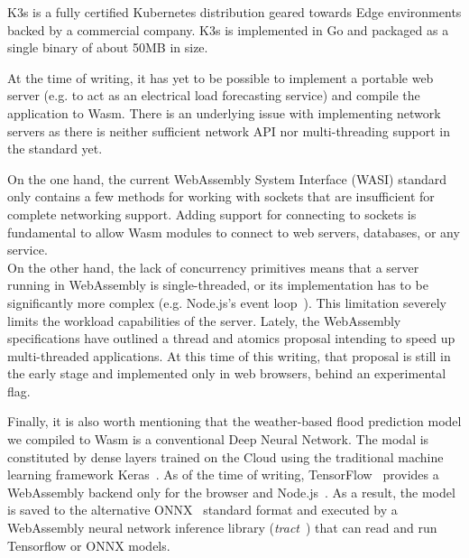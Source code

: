 K3s is a fully certified Kubernetes distribution geared towards Edge environments backed by a commercial company. K3s is implemented in Go and packaged as a single binary of about 50MB in size.

At the time of writing, it has yet to be possible to implement a portable web server (e.g. to act as an electrical load forecasting service) and compile the application to Wasm. There is an underlying issue with implementing network servers as there is neither sufficient network API nor multi-threading support in the standard yet.

On the one hand, the current WebAssembly System Interface (WASI) standard only contains a few methods for working with sockets that are insufficient for complete networking support. Adding support for connecting to sockets is fundamental to allow Wasm modules to connect to web servers, databases, or any service. \\
On the other hand, the lack of concurrency primitives means that a server running in WebAssembly is single-threaded, or its implementation has to be significantly more complex (e.g. Node.js's event loop~\cite{nodejs-event-loop}). This limitation severely limits the workload capabilities of the server. Lately, the WebAssembly specifications have outlined a thread and atomics proposal intending to speed up multi-threaded applications. At this time of this writing, that proposal is still in the early stage and implemented only in web browsers, behind an experimental flag.



Finally, it is also worth mentioning that the weather-based flood prediction model we compiled to Wasm is a conventional Deep Neural Network. The modal is constituted by dense layers trained on the Cloud using the traditional machine learning framework Keras~\cite{keras}. As of the time of writing, TensorFlow~\cite{tensorflow} provides a WebAssembly backend only for the browser and Node.js~\cite{tf-wasm}. As a result, the model is saved to the alternative ONNX~\cite{onnx} standard format and executed by a WebAssembly neural network inference library (\emph{tract}~\cite{tract}) that can read and run Tensorflow or ONNX models. \\

